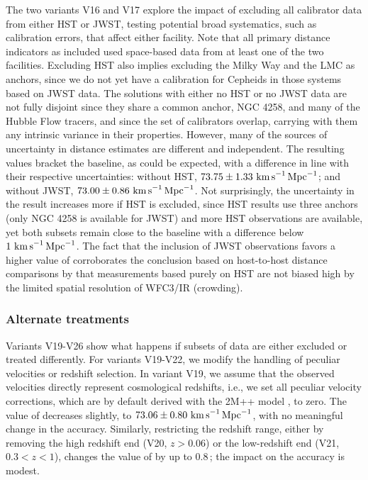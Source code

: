 The two variants V16 and V17 explore the impact of excluding all calibrator  data from either HST or JWST, testing potential broad systematics, such as calibration errors, that affect either facility. Note that all primary distance indicators as included used space-based data from at least one of the two facilities.
Excluding HST also implies excluding the Milky Way and the LMC as anchors, since we do not yet have a calibration for Cepheids in those systems based on JWST data.  The solutions with either no HST or no JWST data are not fully disjoint since they share a common anchor, NGC 4258, and many of the Hubble Flow tracers, and since the set of calibrators overlap, carrying with them any intrinsic variance in their properties.  However, many of the sources of uncertainty in distance estimates are different and independent. The resulting {\Hcst} values bracket the baseline, as could be expected, with a difference in line with their respective uncertainties: without HST, $ 73.75 \pm 1.33 \, \,{\rm km\,s}^{-1}{\rm\,Mpc}^{-1} $; and without JWST, $ 73.00 \pm 0.86 \, \,{\rm km\,s}^{-1}{\rm\,Mpc}^{-1} $.  Not surprisingly, the uncertainty in the result increases more if HST is excluded, since HST results use three anchors (only NGC 4258 is available for JWST) and more HST observations are available, yet both subsets remain close to the baseline with a difference below $ 1 \, \,{\rm km\,s}^{-1}{\rm\,Mpc}^{-1} $. The fact that the inclusion of JWST observations favors a higher value of \Hcst{} corroborates the conclusion based on host-to-host distance comparisons by \citet{2024ApJ...977..120R} that \Hcst{} measurements based purely on HST \citep{2022ApJ...934L...7R} are not biased high by the limited spatial resolution of WFC3/IR (crowding).

\subsubsection {Alternate treatments\label{sec:alternative_medicine}}

Variants V19-V26 show what happens if subsets of data are either excluded or treated differently. For variants V19-V22, we modify the handling of peculiar velocities or redshift selection. In variant V19, we assume that the observed velocities directly represent cosmological redshifts, i.e., we set all peculiar velocity corrections, which are by default derived with the 2M++ model \citep{2015MNRAS.450..317C}, to zero.  The value of {\Hcst} decreases slightly, to $ {73.06} \pm {0.80} \, \,{\rm km\,s}^{-1}{\rm\,Mpc}^{-1} $, with no meaningful change in the accuracy.
Similarly, restricting the redshift range, either by removing the high redshift end (V20, $ z > 0.06 $) or the low-redshift end (V21, $ 0.3 < z < 1 $), changes the value of {\Hcst} by up to 0.8\,{\Hunit}; the impact on the accuracy is modest.

